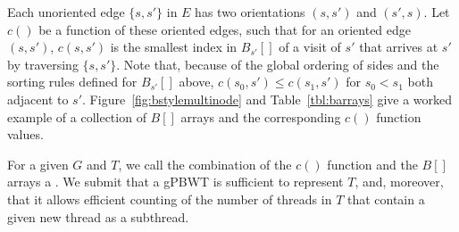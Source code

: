 Each unoriented edge $\{ s, s' \}$ in $E$ has two orientations $(s, s')$ and $(s', s)$. Let $c()$ be a function of these oriented edges, such that for an oriented edge $( s, s' )$, $c(s, s')$ is the smallest index in $B_{s'}[]$ of a visit of $s'$ that arrives at $s'$ by traversing $\{ s, s' \}$. Note that, because of the global ordering of sides and the sorting rules defined for $B_{s'}[]$ above, $c(s_0, s') \leq c(s_1, s')$ for $s_0 < s_1$ both adjacent to $s'$. Figure~\ref{fig:bstylemultinode} and Table~\ref{tbl:barrays} give a worked example of a collection of $B[]$ arrays and the corresponding $c()$ function values.


For a given $G$ and $T$, we call the combination of the $c()$ function and the $B[]$ arrays a . We submit that a gPBWT is sufficient to represent $T$, and, moreover, that it allows efficient counting of the number of threads in $T$ that contain a given new thread as a subthread.

